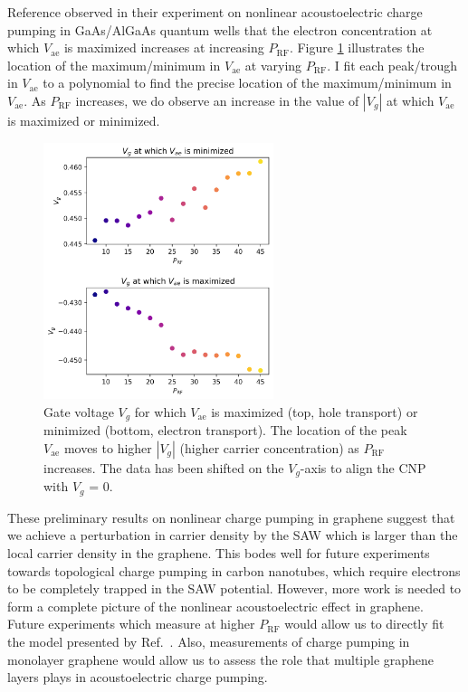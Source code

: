 \documentclass{beavtex_dub_edit}
\begin{document}
Reference \cite{rotter_nonlinear_1999} observed in their experiment on nonlinear acoustoelectric charge pumping in GaAs/AlGaAs quantum wells that the electron concentration at which $V_{\mathrm{ae}}$ is maximized increases at increasing $P_{\mathrm{RF}}$. Figure \ref{Vg at which vae is max or min} illustrates the location of the maximum/minimum in $V_{\mathrm{ae}}$ at varying $P_{\mathrm{RF}}$. I fit each peak/trough in $V_{\mathrm{ae}}$ to a polynomial to find the precise location of the maximum/minimum in $V_{\mathrm{ae}}$. As $P_{\mathrm{RF}}$ increases, we do observe an increase in the value of $|V_g|$ at which $V_{\mathrm{ae}}$ is maximized or minimized.

\begin{figure}
    \includegraphics[width = 0.6\textwidth]{Vg at which vae is max or min.png}
    \caption[Gate voltage $V_g$ for which $V_{\mathrm{ae}}$ is maximized or minimized.]{Gate voltage $V_g$ for which $V_{\mathrm{ae}}$ is maximized (top, hole transport) or minimized (bottom, electron transport). The location of the peak $V_{\mathrm{ae}}$ moves to higher $|V_g|$ (higher carrier concentration) as $P_{\mathrm{RF}}$ increases. The data has been shifted on the $V_g$-axis to align the CNP with $V_g$ = 0.}
    \label{Vg at which vae is max or min}
\end{figure}


These preliminary results on nonlinear charge pumping in graphene suggest that we achieve a perturbation in carrier density by the SAW which is larger than the local carrier density in the graphene. This bodes well for future experiments towards topological charge pumping in carbon nanotubes, which require electrons to be completely trapped in the SAW potential. However, more work is needed to form a complete picture of the nonlinear acoustoelectric effect in graphene. Future experiments which measure at higher $P_{\mathrm{RF}}$ would allow us to directly fit the model presented by Ref.\ \cite{rotter_nonlinear_1999}. Also, measurements of charge pumping in monolayer graphene would allow us to assess the role that multiple graphene layers plays in acoustoelectric charge pumping. 
\end{document}

